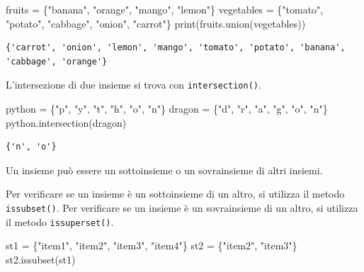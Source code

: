 \documentclass[
  letterpaper,
  krantz2]{{[}./krantz{]}}
\newenvironment{Shaded}{\begin{snugshade}}{\end{snugshade}}
\newcommand{\BuiltInTok}[1]{\textcolor[rgb]{0.00,0.23,0.31}{#1}}
\newcommand{\NormalTok}[1]{\textcolor[rgb]{0.00,0.23,0.31}{#1}}
\newcommand{\OperatorTok}[1]{\textcolor[rgb]{0.37,0.37,0.37}{#1}}
\newcommand{\StringTok}[1]{\textcolor[rgb]{0.13,0.47,0.30}{#1}}
\begin{document}
\begin{Shaded}
\begin{Highlighting}[]
\NormalTok{fruits }\OperatorTok{=}\NormalTok{ \{}\StringTok{"banana"}\NormalTok{, }\StringTok{"orange"}\NormalTok{, }\StringTok{"mango"}\NormalTok{, }\StringTok{"lemon"}\NormalTok{\}}
\NormalTok{vegetables }\OperatorTok{=}\NormalTok{ \{}\StringTok{"tomato"}\NormalTok{, }\StringTok{"potato"}\NormalTok{, }\StringTok{"cabbage"}\NormalTok{, }\StringTok{"onion"}\NormalTok{, }\StringTok{"carrot"}\NormalTok{\}}
\BuiltInTok{print}\NormalTok{(fruits.union(vegetables))}
\end{Highlighting}
\end{Shaded}

\begin{verbatim}
{'carrot', 'onion', 'lemon', 'mango', 'tomato', 'potato', 'banana', 'cabbage', 'orange'}
\end{verbatim}

L'intersezione di due insieme si trova con \texttt{intersection()}.

\begin{Shaded}
\begin{Highlighting}[]
\NormalTok{python }\OperatorTok{=}\NormalTok{ \{}\StringTok{"p"}\NormalTok{, }\StringTok{"y"}\NormalTok{, }\StringTok{"t"}\NormalTok{, }\StringTok{"h"}\NormalTok{, }\StringTok{"o"}\NormalTok{, }\StringTok{"n"}\NormalTok{\}}
\NormalTok{dragon }\OperatorTok{=}\NormalTok{ \{}\StringTok{"d"}\NormalTok{, }\StringTok{"r"}\NormalTok{, }\StringTok{"a"}\NormalTok{, }\StringTok{"g"}\NormalTok{, }\StringTok{"o"}\NormalTok{, }\StringTok{"n"}\NormalTok{\}}
\NormalTok{python.intersection(dragon)}
\end{Highlighting}
\end{Shaded}

\begin{verbatim}
{'n', 'o'}
\end{verbatim}

Un insieme può essere un sottoinsieme o un sovrainsieme di altri
insiemi.

Per verificare se un insieme è un sottoinsieme di un altro, si utilizza
il metodo \texttt{issubset()}. Per verificare se un insieme è un
sovrainsieme di un altro, si utilizza il metodo \texttt{issuperset()}.

\begin{Shaded}
\begin{Highlighting}[]
\NormalTok{st1 }\OperatorTok{=}\NormalTok{ \{}\StringTok{"item1"}\NormalTok{, }\StringTok{"item2"}\NormalTok{, }\StringTok{"item3"}\NormalTok{, }\StringTok{"item4"}\NormalTok{\}}
\NormalTok{st2 }\OperatorTok{=}\NormalTok{ \{}\StringTok{"item2"}\NormalTok{, }\StringTok{"item3"}\NormalTok{\}}
\NormalTok{st2.issubset(st1)}
\end{Highlighting}
\end{Shaded}
\end{document}
